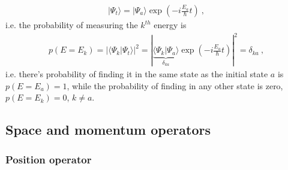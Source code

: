 \documentclass[letterpaper,10pt,english]{jupyterBook}
\begin{document}
\begin{equation*}
\begin{split}| \Psi_t \rangle = | \Psi_a \rangle \exp\left( - i \frac{E_a}{\hbar} t \right) \ ,\end{split}
\end{equation*}
\sphinxAtStartPar
i.e. the probability of measuring the \(k^{th}\) energy is
\begin{equation*}
\begin{split}p(E = E_k) = | \langle \Psi_k | \Psi_t \rangle |^2 = \left| \underbrace{\langle \Psi_k | \Psi_a \rangle}_{\delta_{ka}} \exp\left(-i \frac{E_a}{\hbar} t\right) \right|^2 = \delta_{ka} \ ,\end{split}
\end{equation*}
\sphinxAtStartPar
i.e. there’s probability of finding it in the same state as the initial state \(a\) is \(p(E = E_a) = 1\), while the probability of finding in any other state is zero, \(p(E = E_k) = 0\), \(k \ne a\).


\subsection{Space and momentum operators}
\label{\detokenize{ch/quantum-mechanics/wave-mechanics:space-and-momentum-operators}}\subsubsection*{Position operator}
\end{document}
